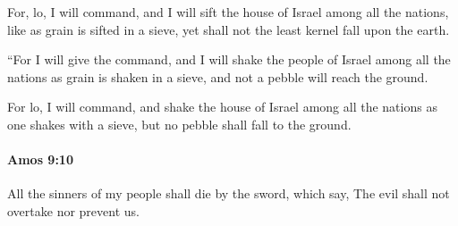 			\begin{versebox}
					\item[BHS] 
					\item[LXX] 
					\item[ASV] For, lo, I will command, and I will sift the house of Israel among all the nations, like as grain is sifted in a sieve, yet shall not the least kernel fall upon the earth.
					\item[NIV] “For I will give the command, and I will shake the people of Israel among all the nations as grain is shaken in a sieve, and not a pebble will reach the ground.
					\item[NRSV] For lo, I will command, and shake the house of Israel among all the nations as one shakes with a sieve, but no pebble shall fall to the ground.
			\end{versebox}

		\paragraph{Amos 9:10} %
			\label{AMOS-9-10}

			All the sinners of my people shall die by the sword, which say, The evil shall not overtake nor prevent us.

